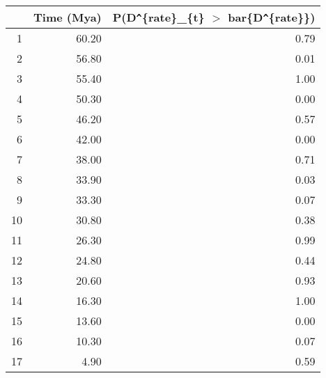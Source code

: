 \begin{table}[ht]
\centering
\begin{tabular}{rrr}
  \hline
 & Time (Mya) & P(D\verb|^|\{rate\}\_\{t\} $>$ bar\{D\verb|^|\{rate\}\}) \\ 
  \hline
1 & 60.20 & 0.79 \\ 
  2 & 56.80 & 0.01 \\ 
  3 & 55.40 & 1.00 \\ 
  4 & 50.30 & 0.00 \\ 
  5 & 46.20 & 0.57 \\ 
  6 & 42.00 & 0.00 \\ 
  7 & 38.00 & 0.71 \\ 
  8 & 33.90 & 0.03 \\ 
  9 & 33.30 & 0.07 \\ 
  10 & 30.80 & 0.38 \\ 
  11 & 26.30 & 0.99 \\ 
  12 & 24.80 & 0.44 \\ 
  13 & 20.60 & 0.93 \\ 
  14 & 16.30 & 1.00 \\ 
  15 & 13.60 & 0.00 \\ 
  16 & 10.30 & 0.07 \\ 
  17 & 4.90 & 0.59 \\ 
   \hline
\end{tabular}
\label{tab:rate_peak}
\end{table}

